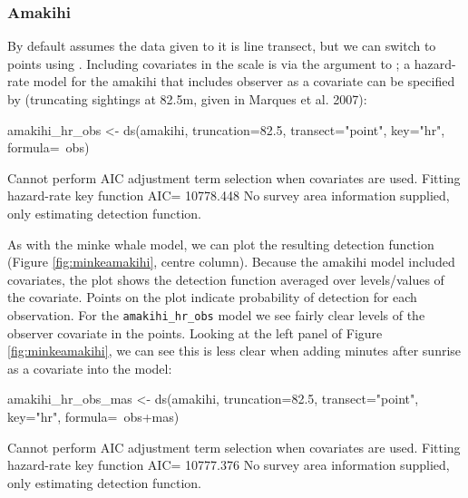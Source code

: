 \documentclass[article]{jss}
\begin{document}
\subsubsection{Amakihi}\label{amakihi-1}

By default  assumes the data given to it is line transect, but
we can switch to points using . Including
covariates in the scale is via the  argument to
; a hazard-rate model for the amakihi that includes observer as
a covariate can be specified by (truncating sightings at 82.5m, given in
Marques et al. 2007):

\begin{CodeChunk}
\begin{CodeInput}
amakihi_hr_obs <- ds(amakihi, truncation=82.5, transect="point",
                     key="hr", formula=~obs)
\end{CodeInput}
\begin{CodeOutput}
Cannot perform AIC adjustment term selection when covariates are used.
Fitting hazard-rate key function
AIC= 10778.448
No survey area information supplied, only estimating detection function.
\end{CodeOutput}
\end{CodeChunk}

As with the minke whale model, we can plot the resulting detection
function (Figure \ref{fig:minkeamakihi}, centre column). Because the
amakihi model included covariates, the plot shows the detection function
averaged over levels/values of the covariate. Points on the plot
indicate probability of detection for each observation. For the
\texttt{amakihi\_hr\_obs} model we see fairly clear levels of the
observer covariate in the points. Looking at the left panel of Figure
\ref{fig:minkeamakihi}, we can see this is less clear when adding
minutes after sunrise as a covariate into the model:

\begin{CodeChunk}
\begin{CodeInput}
amakihi_hr_obs_mas <- ds(amakihi, truncation=82.5, transect="point",
                         key="hr", formula=~obs+mas)
\end{CodeInput}
\begin{CodeOutput}
Cannot perform AIC adjustment term selection when covariates are used.
Fitting hazard-rate key function
AIC= 10777.376
No survey area information supplied, only estimating detection function.
\end{CodeOutput}
\end{CodeChunk}
\end{document}
